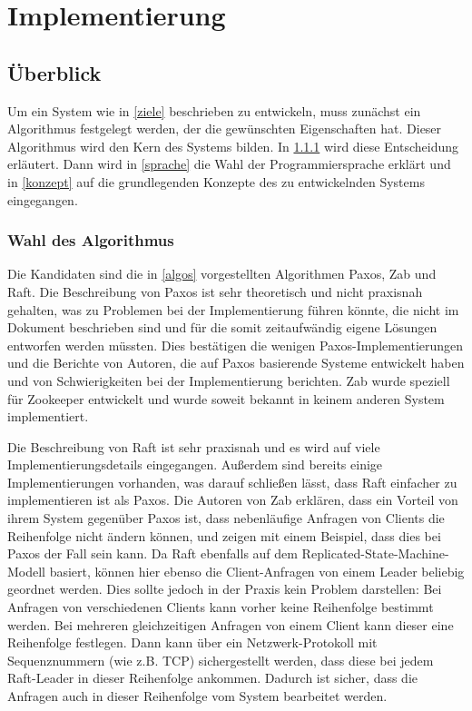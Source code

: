 \chapter{Implementierung}
\label{impl}

\section{Überblick}

Um ein System wie in \ref{ziele} beschrieben zu entwickeln, muss zunächst ein Algorithmus festgelegt werden, der die gewünschten Eigenschaften hat. Dieser Algorithmus wird den Kern des Systems bilden. In \ref{algo} wird diese Entscheidung erläutert. Dann wird in \ref{sprache} die Wahl der Programmiersprache erklärt und in \ref{konzept} auf die grundlegenden Konzepte des zu entwickelnden Systems eingegangen.

\subsection{Wahl des Algorithmus}
\label{algo}

Die Kandidaten sind die in \ref{algos} vorgestellten Algorithmen Paxos, Zab und Raft. Die Beschreibung von Paxos ist sehr theoretisch und nicht praxisnah gehalten, was zu Problemen bei der Implementierung führen könnte, die nicht im Dokument beschrieben sind und für die somit zeitaufwändig eigene Lösungen entworfen werden müssten. Dies bestätigen die wenigen Paxos-Implementierungen und die Berichte von Autoren, die auf Paxos basierende Systeme entwickelt haben und von Schwierigkeiten bei der Implementierung berichten. Zab wurde speziell für Zookeeper entwickelt und wurde soweit bekannt in keinem anderen System implementiert. 

Die Beschreibung von Raft ist sehr praxisnah und es wird auf viele Implementierungsdetails eingegangen. Außerdem sind bereits einige Implementierungen vorhanden, was darauf schließen lässt, dass Raft einfacher zu implementieren ist als Paxos. Die Autoren von Zab erklären, dass ein Vorteil von ihrem System gegenüber Paxos ist, dass nebenläufige Anfragen von Clients die Reihenfolge nicht ändern können, und zeigen mit einem Beispiel, dass dies bei Paxos der Fall sein kann. Da Raft ebenfalls auf dem Replicated-State-Machine-Modell basiert, können hier ebenso die Client-Anfragen von einem Leader beliebig geordnet werden. Dies sollte jedoch in der Praxis kein Problem darstellen: Bei Anfragen von verschiedenen Clients kann vorher keine Reihenfolge bestimmt werden. Bei mehreren gleichzeitigen Anfragen von einem Client kann dieser eine Reihenfolge festlegen. Dann kann über ein Netzwerk-Protokoll mit Sequenznummern (wie z.B. TCP) sichergestellt werden, dass diese bei jedem Raft-Leader in dieser Reihenfolge ankommen. Dadurch ist sicher, dass die Anfragen auch in dieser Reihenfolge vom System bearbeitet werden.
 
